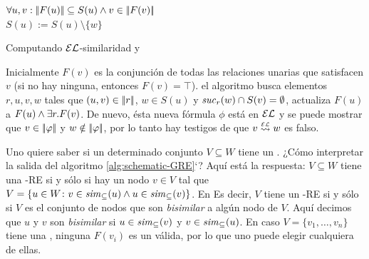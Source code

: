\begin{algorithm}\small
\io


\While{\guard}
{
  $\forall u,v: |\!|F(u)|\!| \subseteq S(u)\wedge v \in |\!|F(v)|\!|$\\
$S(u):=S(u)\setminus\{w\}$ \label{alg:line:loop-body-begin}

} \caption{\small
Computando $\mathcal{EL}$-similaridad y \posre}\label{alg:schematic-GRE}
\end{algorithm}

Inicialmente $F(v)$ es la conjunci\'on de todas las relaciones unarias que
satisfacen $v$ (si no hay ninguna, entonces $F(v)=\top$).
el algoritmo busca elementos $r,u,v,w$ tales que
$(u,v)\in|\!|r|\!|$, $w\in S(u)$ y ${\it suc}_{r}(w)\cap
S(v)=\emptyset$, actualiza $F(u)$ a $F(u)\wedge\exists r. F(v)$.
De nuevo, \'esta nueva f\'ormula $\phi$ est\'a en $\mathcal{EL}$ y se puede mostrar que
$v\in|\!|\varphi|\!|$ y $w\notin|\!|\varphi|\!|$, por lo tanto hay testigos de que $v\simil{\EL} w$ es falso.



%

\iffullversion Uno quiere saber si un determinado conjunto  $V\subseteq W$
tiene un \posre. ¿C\'omo interpretar la salida del algoritmo
\ref{alg:schematic-GRE}`? Aqu\'i est\'a la respuesta: $V\subseteq W$ tiene una
\EL-RE si y s\'olo si hay un nodo $v\in V$ tal que  $V=\{u\in W\colon
v\in{\it sim}_\subseteq(u) \wedge u\in{\it sim}_\subseteq(v)\}$. En
Es decir, $V$ tiene un \EL-RE si y s\'olo si $V$ es el conjunto de nodos que son
\emph{bisimilar} a alg\'un nodo de $V$. Aqu\'i decimos que $u$ y $v$
son \emph{bisimilar} si $u\in{\it sim}_\subseteq(v)$ y
$v\in{\it sim}_\subseteq(u)$. En caso  $V=\{v_1,\dots,v_n\}$ tiene una
\posre, ninguna $F(v_i)$ es un \posre v\'alida, por lo que uno puede elegir cualquiera de ellas.

